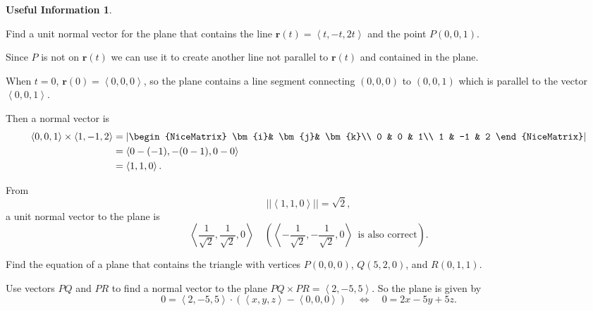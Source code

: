 \documentclass[12pt]{exam}
\newcommand{\bi}{\bm{i}}
\newcommand{\bj}{\bm{j}}
\newcommand{\bk}{\bm{k}}
\newcommand{\br}{\bm{r}}
\newcommand{\gen}[1]{\left\langle #1 \right\rangle}
\theoremstyle{definition}
\newtheorem*{info}{Useful Information}
\theoremstyle{remark}
\begin{document}
\begin{questions}
\begin{info}
\end{info}

\question Find a unit normal vector for the plane that contains the line \(\br(t)=\gen{t,-t,2t}\) and the point \(P(0,0,1)\).

\ifprintanswers
        \begin{solution}
            Since \(P\) is not on \(\br(t)\) we can use it to create another line not parallel to \(\br(t)\) and contained in the plane.

            When \(t=0\), \(\br(0)=\gen{0,0,0}\), so the plane contains a line segment connecting \((0,0,0)\) to \((0,0,1)\) which is parallel to the vector
            \(\gen{0,0,1}\).

            Then a normal vector is 
            \begin{align*}
            \gen{0,0,1}\times\gen{1,-1,2} & = 
                \left|
                    \begin{NiceMatrix}
                    \bi & \bj & \bk\\
                      0 & 0 & 1\\
                1 & -1 & 2 
                \end{NiceMatrix}\right| \\
                & = \gen{0-(-1),-(0-1),0-0}\\
                & = \gen{1,1,0}.
            \end{align*}

From \[
    ||\gen{1,1,0}|| = \sqrt{2},
\]
a unit normal vector to the plane is  
\[
    \gen{\frac{1}{\sqrt{2}},\frac{1}{\sqrt{2}},0} \quad (\gen{-\frac{1}{\sqrt{2}},-\frac{1}{\sqrt{2}},0}~~\text{is also correct}).
\]

        \end{solution}
    \else
        \vfill
    \fi

\question Find the equation of a plane that contains the triangle with vertices \(P(0,0,0)\), \(Q(5,2,0)\), and \(R(0,1,1)\).

\ifprintanswers
        \begin{solution}

            Use vectors \(PQ\) and \(PR\) to find a normal vector to the plane \(PQ\times PR=\gen{2,-5,5}\).
            So the plane is given by
            \[
                0 = \gen{2,-5,5}\cdot\left(\gen{x,y,z}-\gen{0,0,0}\right) \quad \iff \quad 0 = 2x-5y+5z.
            \]

        \end{solution}
    \else
        \vfill
    \fi 


\end{questions}
\end{document}
